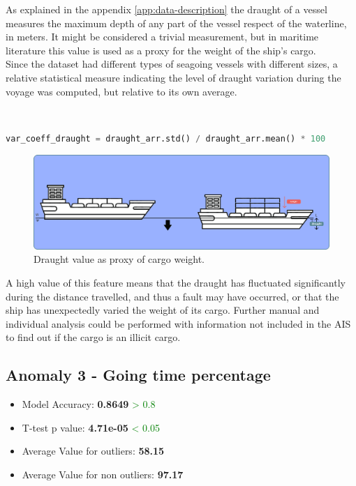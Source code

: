 As explained in the appendix \ref{app:data-description} the draught of a vessel measures the maximum depth of any part of the vessel respect of the waterline, in meters. It might be considered a trivial measurement, but in maritime literature this value is used as a proxy for the weight of the ship's cargo.
\\
Since the dataset had different types of seagoing vessels with different sizes, a relative statistical measure indicating the level of draught variation during the voyage was computed, but relative to its own average.

\\
\begin{lstlisting}[language=Python]
    var_coeff_draught = draught_arr.std() / draught_arr.mean() * 100
\end{lstlisting} 


\begin{figure}[H]
    \centering
    \includegraphics[width=16.5cm]{Images/3/anomaly-2.png}
    \caption{Draught value as proxy of cargo weight.}
\end{figure}

A high value of this feature means that the draught has fluctuated significantly during the distance travelled, and thus a fault may have occurred, or that the ship has unexpectedly varied the weight of its cargo. Further manual and individual analysis could be performed with information not included in the AIS to find out if the cargo is an illicit cargo.

\clearpage
\subsection{Anomaly 3 - Going time percentage}
\label{sec:anomaly-3}


\begin{itemize}
\item Model Accuracy: \textbf{0.8649} \textcolor{green}{> 0.8}
\item T-test p value: \textbf{4.71e-05} \textcolor{green}{< 0.05}
\item Average Value for outliers: \textbf{58.15}
\item Average Value for non outliers: \textbf{97.17}
\end{itemize}

